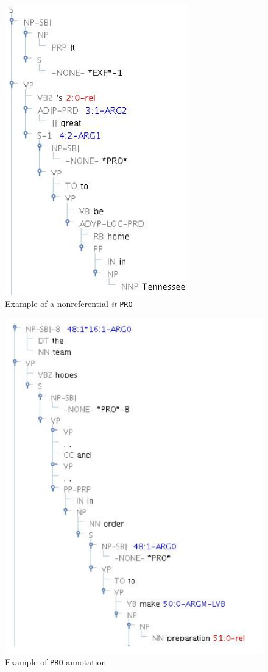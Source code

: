 \documentclass[11pt]{report}
\begin{document}
\begin{figure}[htbp]
\centering
\includegraphics[scale=0.5]{img/Nonrefitpro.png}
\caption{Example of a nonreferential \textit{it} \texttt{PRO}}
\label{fig: Nonrefitpro}
\end{figure}
\begin{figure}[htbp]
\centering
\includegraphics[scale=0.5]{img/PROann.png}
\caption{Example of \texttt{PRO} annotation}
\label{fig: PROann}
\end{figure}
\end{document}
